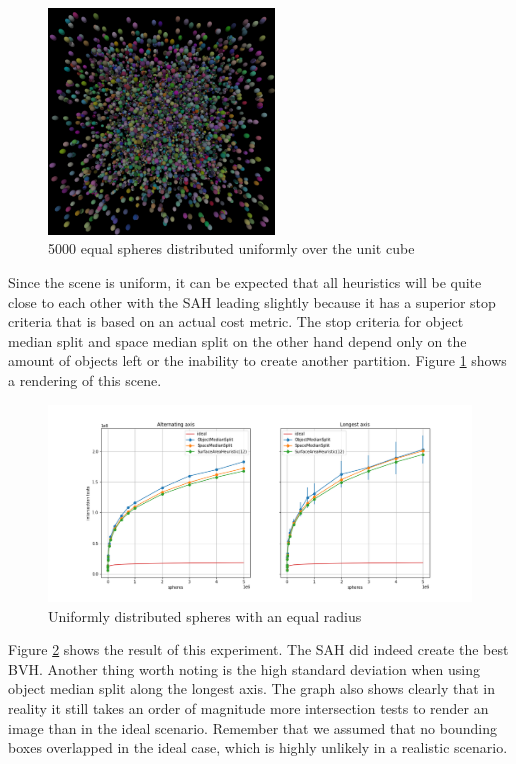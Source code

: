 \documentclass{article}
\begin{document}
\begin{figure}[!htb]
    \centering
    \includegraphics[width=6cm]{renders/equal_spheres_uniform_position.png}
    \caption{5000 equal spheres distributed uniformly over the unit cube}
    \label{fig:equal_spheres_uniform_position}
\end{figure}

Since the scene is uniform, it can be expected that all heuristics will be quite close to each other with the SAH leading slightly because it has a superior stop criteria that is based on an actual cost metric. The stop criteria for object median split and space median split on the other hand depend only on the amount of objects left or the inability to create another partition. Figure \ref{fig:equal_spheres_uniform_position} shows a rendering of this scene.

\begin{figure}[!htb]
    \centering
    \includegraphics[width=12cm]{plots/splitting_heuristisc_equal_spheres_uniform_position.png}
    \caption{Uniformly distributed spheres with an equal radius}
    \label{fig:splitting_heuristisc_equal_spheres_uniform_position}
\end{figure}

Figure \ref{fig:splitting_heuristisc_equal_spheres_uniform_position} shows the result of this experiment. The SAH did indeed create the best BVH. Another thing worth noting is the high standard deviation when using object median split along the longest axis. The graph also shows clearly that in reality it still takes an order of magnitude more intersection tests to render an image than in the ideal scenario. Remember that we assumed that no bounding boxes overlapped in the ideal case, which is highly unlikely in a realistic scenario.
\end{document}
